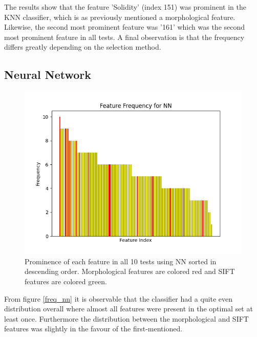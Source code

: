 \documentclass{kththesis}
\begin{document}
\newpage

The results show that the feature 'Solidity' (index 151) was prominent in the KNN classifier, which is as previously mentioned a morphological feature. Likewise, the second most prominent feature was '161' which was the second most prominent feature in all tests. A final observation is that the frequency differs greatly depending on the selection method.


\newpage

\subsection{Neural Network}

\begin{figure}[h!]
  \centering
  \includegraphics[scale=0.8]{figures/nn_all_freqs.png}
  \caption{Prominence of each feature in all 10 tests using NN sorted in descending order. Morphological features are colored red and SIFT features are colored green.}
  \label{fig:freq_nn}
\end{figure}

\newpage

From figure \ref{freq_nn} it is observable that the classifier had a quite even distribution overall where almost all features were present in the optimal set at least once. Furthermore the distribution between the morphological and SIFT features was slightly in the favour of the first-mentioned.  
\end{document}
